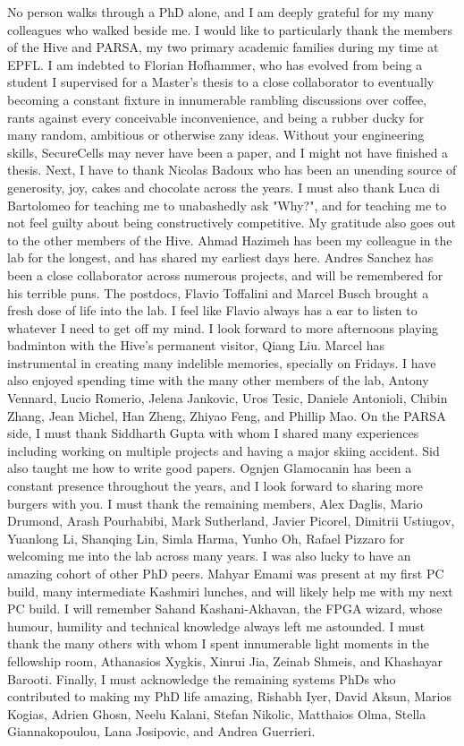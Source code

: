 No person walks through a PhD alone, and I am deeply grateful for my
many colleagues who walked beside me.
I would like to particularly thank the members of the Hive and PARSA, my two 
primary academic families during my time at EPFL. 
I am indebted to Florian Hofhammer, who has evolved from being a
student I supervised for a Master's thesis to a close collaborator to
eventually becoming a constant fixture in 
innumerable rambling discussions over coffee,
rants against every conceivable inconvenience, and 
being a rubber ducky for many random, ambitious or otherwise zany ideas.
Without your engineering skills, SecureCells may never have been a
paper, and I might not have finished a thesis.
Next, I have to thank Nicolas Badoux who has been an unending source of generosity, 
joy, cakes and chocolate across the years.
I must also thank Luca di Bartolomeo for teaching me to unabashedly ask "Why?",
and for teaching me to not feel guilty about being constructively competitive.
My gratitude also goes out to the other members of the Hive.
Ahmad Hazimeh has been my colleague in the lab for the longest, and has 
shared my earliest days here.
Andres Sanchez has been a close collaborator across numerous projects, and
will be remembered for his terrible puns.
The postdocs, Flavio Toffalini and Marcel Busch brought a fresh dose of life into the lab. 
I feel like Flavio always has a ear to listen to whatever I need to get off my mind.
I look forward to more afternoons playing badminton with the Hive's permanent
visitor, Qiang Liu.
Marcel has instrumental in creating many indelible memories, specially on Fridays.
I have also enjoyed spending time with the many other members of the lab, 
Antony Vennard, Lucio Romerio, Jelena Jankovic, Uros Tesic, Daniele Antonioli,
Chibin Zhang, Jean Michel, Han Zheng, Zhiyao Feng, and Phillip Mao.
On the PARSA side, I must thank Siddharth Gupta with
whom I shared many experiences including  
working on multiple projects and having a major skiing accident.
Sid also taught me how to write good papers.
Ognjen Glamocanin has been a constant presence throughout the years, and I 
look forward to sharing more burgers with you.
I must thank the remaining members, Alex Daglis, Mario Drumond, Arash Pourhabibi,
Mark Sutherland, Javier Picorel, Dimitrii Ustiugov,
Yuanlong Li, Shanqing Lin, Simla Harma, Yunho Oh, Rafael Pizzaro 
for welcoming me into the lab across many years.
I was also lucky to have an amazing cohort of other PhD peers.
Mahyar Emami was present at my first PC build, many intermediate Kashmiri lunches,
and will likely help me with my next PC build.
I will remember Sahand Kashani-Akhavan, the FPGA wizard, whose humour, 
humility and technical knowledge always left me astounded.
I must thank the many others with whom I spent innumerable light
moments in the fellowship room, Athanasios Xygkis, Xinrui Jia, 
Zeinab Shmeis, and Khashayar Barooti.
Finally, I must acknowledge the remaining systems PhDs who contributed to
making my PhD life amazing, Rishabh Iyer, David Aksun, Marios Kogias, Adrien Ghosn,
Neelu Kalani, Stefan Nikolic, Matthaios Olma, Stella Giannakopoulou,
Lana Josipovic,  and Andrea Guerrieri. 

